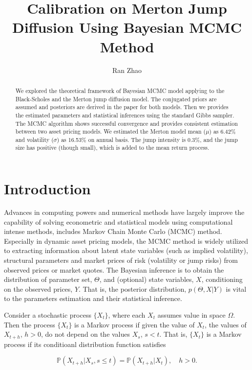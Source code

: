 \documentclass[11pt,reqno,final]{amsart}
\title{Calibration on Merton Jump Diffusion Using Bayesian MCMC Method}
\author{Ran Zhao}
\begin{document}
\begin{abstract}
We explored the theoretical framework of Bayesian MCMC model applying to the Black-Scholes and the Merton jump diffusion model. The conjugated priors are assumed and posteriors are derived in the paper for both models. Then we provides the estimated parameters and statistical inferences using the standard Gibbs sampler. The MCMC algorithm shows successful convergence and provides consistent  estimation between two asset pricing models. We estimated the Merton model mean ($\mu$) as 6.42\% and volatility ($\sigma$) as 16.53\% on annual basis. The jump intensity is 0.3\%, and the jump size has positive (though small), which is added to the mean return process.
\end{abstract}

\maketitle
%
%
%
\section{Introduction}
Advances in computing powers and numerical methods have largely improve the capability of solving econometric and statistical models using computational intense methods, includes Markov Chain Monte Carlo (MCMC) method. Especially in dynamic asset pricing models, the MCMC method is widely utilized to extracting information about latent state variables (such as implied volatility), structural parameters and market prices of risk (volatility or jump risks) from observed prices or market quotes. The Bayesian inference is to obtain the distribution of parameter set, $\Theta$, and (optional) state variables, $X$, conditioning on the observed prices, $Y$. That is, the posterior distribution, $p(\Theta, X|Y)$ is vital to the parameters estimation and their statistical inference.

Consider a stochastic process $\{X_t\}$, where each $X_t$ assumes value in space $\Omega$. Then the process $\{X_t\}$ is a Markov process if given the value of $X_t$, the values of $X_{t+h}$, $h>0$, do not depend on the values $X_s$, $s<t$. That is, $\{X_t\}$ is a Markov process if its conditioanl distribution function satisfies

$$
\mathbb{P}(X_{t+h}|X_s, s \leq t) = \mathbb{P}(X_{t+h}|X_t), \quad h>0.
$$
\end{document}

